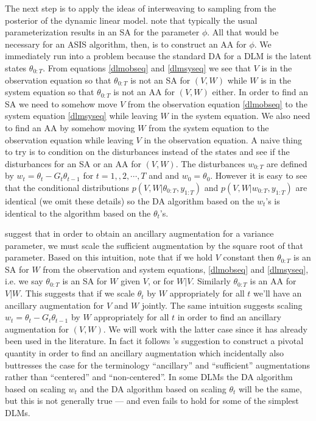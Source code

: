 \documentclass{article}
\begin{document}
The next step is to apply the ideas of interweaving to sampling from the posterior of the dynamic linear model. \citet{papaspiliopoulos2007general} note that typically the usual parameterization results in an SA for the parameter $\phi$. All that would be necessary for an ASIS algorithm, then, is to construct an AA for $\phi$. We immediately run into a problem because the standard DA for a DLM is the latent states $\theta_{0:T}$. From equations \eqref{dlmobseq} and \eqref{dlmsyseq} we see that $V$ is in the observation equation so that $\theta_{0:T}$ is not an SA for $(V,W)$ while $W$ is in the system equation so that $\theta_{0:T}$ is not an AA for $(V,W)$ either. In order to find an SA we need to somehow move $V$ from the observation equation \eqref{dlmobseq} to the system equation \eqref{dlmsyseq} while leaving $W$ in the system equation. We also need to find an AA by somehow moving $W$ from the system equation to the observation equation while leaving $V$ in the observation equation. A naive thing to try is to condition on the disturbances instead of the states and see if the disturbances for an SA or an AA for $(V,W)$. The disturbances $w_{0:T}$ are defined by $w_t = \theta_t - G_t\theta_{t-1}$ for $t=1,,2,\cdots,T$ and and $w_0=\theta_0$. However it is easy to see that the conditional distributions $p(V,W|\theta_{0:T},y_{1:T})$ and $p(V,W|w_{0:T},y_{1:T})$ are identical (we omit these details) so the DA algorithm based on the $w_t$'s is identical to the algorithm based on the $\theta_t$'s.

\citet{papaspiliopoulos2007general} suggest that in order to obtain an ancillary augmentation for a variance parameter, we must scale the sufficient augmentation by the square root of that parameter. Based on this intuition, note that if we hold $V$ constant then $\theta_{0:T}$ is an SA for $W$ from the observation and system equations, \eqref{dlmobseq} and \eqref{dlmsyseq}, i.e. we say $\theta_{0:T}$ is an SA for $W$ given $V$, or for $W|V$. Similarly $\theta_{0:T}$ is an AA for $V|W$. This suggests that if we scale $\theta_{t}$ by $W$ appropriately for all $t$ we'll have an ancillary augmentation for $V$ and $W$ jointly. The same intuition suggests scaling $w_{t}=\theta_{t}-G_t\theta_{t-1}$ by $W$ appropriately for all $t$ in order to find an ancillary augmentation for $(V,W)$. We will work with the latter case since it has already been used in the literature. In fact it follows \citet{papaspiliopoulos2007general}'s suggestion to construct a pivotal quantity in order to find an ancillary augmentation which incidentally also buttresses the case for the terminology ``ancillary'' and ``sufficient'' augmentations rather than ``centered'' and ``non-centered''. In some DLMs the DA algorithm based on scaling $w_t$ and the DA algorithm based on scaling $\theta_t$ will be the same, but this is not generally true --- and even fails to hold for some of the simplest DLMs.
\end{document}
